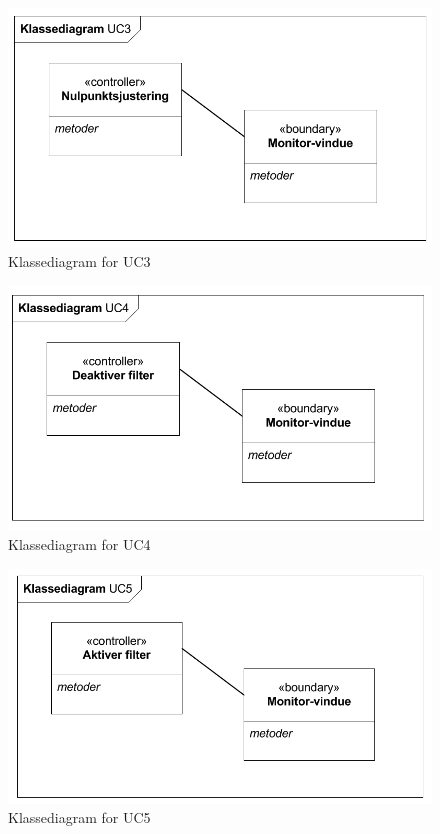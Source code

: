 \begin{figure}[H]
	\centering
	\includegraphics[width=1\textwidth]{Figurer/Snip20151104_39}
	\caption{Klassediagram for UC3}
\end{figure}

\begin{figure}[H]
	\centering
	\includegraphics[width=1\textwidth]{Figurer/Snip20151104_40}
	\caption{Klassediagram for UC4}
\end{figure}

\begin{figure}[H]
	\centering
	\includegraphics[width=1\textwidth]{Figurer/Snip20151104_41}
	\caption{Klassediagram for UC5}
\end{figure}

